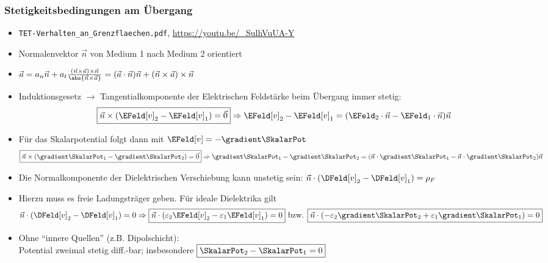 \begin{frame}
  \frametitle{Stetigkeitsbedingungen am Übergang}
  \begin{itemize}[<+->]
  \item \texttt{TET-Verhalten\_an\_Grenzflaechen.pdf}, \url{https://youtu.be/_SulhVuUA-Y}
  \item Normalenvektor $\vec{n}$ von Medium 1 nach Medium 2 orientiert
    \item $\vec{a} = a_n \vec{n} + a_t \frac{(\vec{n}\times \vec{a})\times\vec{n}}{\abs{\vec{n}\times \vec{a}}} = (\vec{a}\cdot\vec{n}) \vec{n} + (\vec{n}\times \vec{a})\times\vec{n}$  
  \item Induktionsgesetz $\to$ Tangentialkomponente der Elektrischen Feldstärke beim Übergang \alert{immer stetig}:
    \begin{equation*}
      \boxed{\vec{n} \times \left( \EFeld[v]_2 - \EFeld[v]_1\right) = \vec{0}} \Rightarrow \EFeld[v]_2 - \EFeld[v]_1 = (\EFeld_2\cdot\vec{n} - \EFeld_1\cdot\vec{n}) \vec{n} 
    \end{equation*}
    \item Für das Skalarpotential folgt dann mit $\EFeld[v] = -\gradient \SkalarPot$
    \begin{equation*}
      \boxed{\vec{n} \times \left( \gradient \SkalarPot_1 - \gradient \SkalarPot_2\right) = \vec{0}} \Rightarrow \gradient \SkalarPot_1 - \gradient \SkalarPot_2 = (\vec{n}\cdot\gradient \SkalarPot_1 - \vec{n}\cdot\gradient \SkalarPot_2) \vec{n}
    \end{equation*}
  \item Die Normalkomponente der Dielektrischen Verschiebung \alert{kann unstetig sein}: $\vec{n}\cdot (\DFeld[v]_2 - \DFeld[v]_1 ) = \rho_F$
  \item Hierzu muss es freie Ladungsträger geben. Für \alert{ideale Dielektrika} gilt
    \begin{equation*}
      \vec{n}\cdot (\DFeld[v]_2 - \DFeld[v]_1 ) = 0 \Rightarrow \boxed{\vec{n}\cdot (\varepsilon_2\EFeld[v]_2 - \varepsilon_1\EFeld[v]_1 ) =0 } \text{ bzw. } \boxed{\vec{n}\cdot (-\varepsilon_2\gradient\SkalarPot_2 + \varepsilon_1\gradient\SkalarPot_1 ) =0 } 
    \end{equation*}
    \item Ohne \enquote{innere Quellen} (z.B. Dipolschicht):\\ \alert{Potential zweimal stetig diff.-bar}; insbesondere $\boxed{\SkalarPot_2-\SkalarPot_1 = 0}$
    \end{itemize}
  \end{frame}


